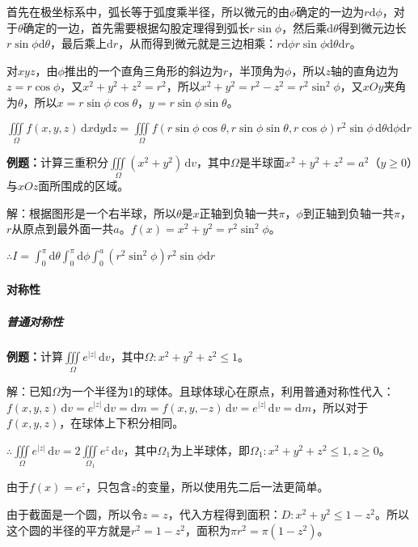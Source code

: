 \documentclass[UTF8, 12pt]{ctexart}
\begin{document}
首先在极坐标系中，弧长等于弧度乘半径，所以微元的由$\phi$确定的一边为$r\textrm{d}\phi$，对于$\theta$确定的一边，首先需要根据勾股定理得到弧长$r\sin\phi$，然后乘$\textrm{d}\theta$得到微元边长$r\sin\phi\textrm{d}\theta$，最后乘上$\textrm{d}r$，从而得到微元就是三边相乘：$r\textrm{d}\phi r\sin\phi\textrm{d}\theta\textrm{d}r$。

对$xyz$，由$\phi$推出的一个直角三角形的斜边为$r$，半顶角为$\phi$，所以$z$轴的直角边为$z=r\cos\phi$，又$x^2+y^2+z^2=r^2$，所以$x^2+y^2=r^2-z^2=r^2\sin^2\phi$，又$xOy$夹角为$\theta$，所以$x=r\sin\phi\cos\theta$，$y=r\sin\phi\sin\theta$。

$\iiint\limits_\Omega f(x,y,z)\,\textrm{d}x\textrm{d}y\textrm{d}z=\iiint\limits_\Omega f(r\sin\phi\cos\theta,r\sin\phi\sin\theta,r\cos\phi)r^2\sin\phi\,\textrm{d}\theta\textrm{d}\phi\textrm{d}r$

\textbf{例题：}计算三重积分$\iiint\limits_\Omega(x^2+y^2)\,\textrm{d}v$，其中$\Omega$是半球面$x^2+y^2+z^2=a^2$（$y\geqslant0$）与$xOz$面所围成的区域。

解：根据图形是一个右半球，所以$\theta$是$x$正轴到负轴一共$\pi$，$\phi$到正轴到负轴一共$\pi$，$r$从原点到最外面一共$a$。$f(x)=x^2+y^2=r^2\sin^2\phi$。

$\therefore I=\int_0^\pi\textrm{d}\theta\int_0^\pi\textrm{d}\phi\int_0^a(r^2\sin^2\phi)r^2\sin\phi\textrm{d}r$

\paragraph{对称性} \leavevmode \medskip

\subparagraph{普通对称性} \leavevmode \medskip

\textbf{例题：}计算$\iiint\limits_\Omega e^{\vert z\vert}\,\textrm{d}v$，其中$\Omega:x^2+y^2+z^2\leqslant1$。

解：已知$\Omega$为一个半径为1的球体。且球体球心在原点，利用普通对称性代入：$f(x,y,z)\,\textrm{d}v=e^{\vert z\vert}\,\textrm{d}v=\textrm{d}m=f(x,y,-z)\,\textrm{d}v=e^{\vert z\vert}\,\textrm{d}v=\textrm{d}m$，所以对于$f(x,y,z)$，在球体上下积分相同。

$\therefore\iiint\limits_\Omega e^{\vert z\vert}\,\textrm{d}v=2\iiint\limits_{\Omega_1}e^z\,\textrm{d}v$，其中$\Omega_1$为上半球体，即$\Omega_1:x^2+y^2+z^2\leqslant1,z\geqslant0$。

由于$f(x)=e^z$，只包含$z$的变量，所以使用先二后一法更简单。

由于截面是一个圆，所以令$z=z$，代入方程得到面积：$D:x^2+y^2\leqslant1-z^2$。所以这个圆的半径的平方就是$r^2=1-z^2$，面积为$\pi r^2=\pi(1-z^2)$。
\end{document}
